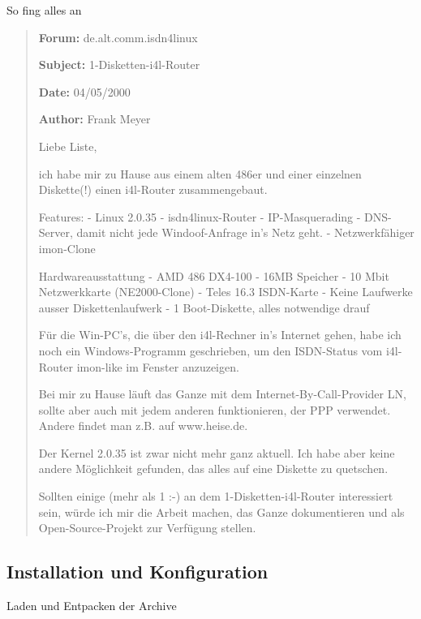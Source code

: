 \documentclass[t]{beamer}
\makeatletter
\newcommand{\strong}[1]{\@strong{#1}}
\newcommand{\@@strong}[1]{\textbf{\let\@strong\@@@strong#1}}
\newcommand{\@@@strong}[1]{\textnormal{\let\@strong\@@strong#1}}
\let\@strong\@@strong
\makeatother
\begin{document}
\begin{frame}{So fing alles an}
    \blockquote{\footnotesize%
\strong{Forum:} de.alt.comm.isdn4linux

\strong{Subject:} 1-Disketten-i4l-Router

\strong{Date:} 04/05/2000

\strong{Author:} Frank Meyer
\scriptsize

Liebe Liste,

ich habe mir zu Hause aus einem alten 486er und einer einzelnen Diskette(!)
einen i4l-Router zusammengebaut.

Features:
- Linux 2.0.35
- isdn4linux-Router
- IP-Masquerading
- DNS-Server, damit nicht jede Windoof-Anfrage in's Netz geht.
- Netzwerkfähiger imon-Clone

Hardwareausstattung
- AMD 486 DX4-100
- 16MB Speicher
- 10 Mbit Netzwerkkarte (NE2000-Clone)
- Teles 16.3 ISDN-Karte
- Keine Laufwerke ausser Diskettenlaufwerk
- 1 Boot-Diskette, alles notwendige drauf

Für die Win-PC's, die über den i4l-Rechner in's Internet gehen, habe
ich noch ein Windows-Programm geschrieben, um den ISDN-Status vom
i4l-Router imon-like im Fenster anzuzeigen.

Bei mir zu Hause läuft das Ganze mit dem Internet-By-Call-Provider LN,
sollte aber auch mit jedem anderen funktionieren, der PPP verwendet.
Andere findet man z.B. auf www.heise.de.

Der Kernel 2.0.35 ist zwar nicht mehr ganz aktuell. Ich habe aber keine
andere Möglichkeit gefunden, das alles auf eine Diskette zu quetschen.

Sollten einige (mehr als 1 :-) an dem 1-Disketten-i4l-Router
interessiert sein, würde ich mir die Arbeit machen, das Ganze
dokumentieren und als Open-Source-Projekt zur Verfügung stellen.
    }
\end{frame}

\subsection{Installation und Konfiguration}

\begin{frame}{Laden und Entpacken der Archive}
    \begin{figure}
    \end{figure}
\end{frame}
\end{document}

